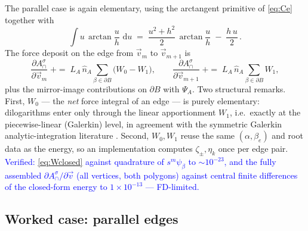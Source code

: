 \documentclass[11pt]{article}
\newcommand{\aside}[1]{\textcolor{blue}{#1}}
\newcommand{\atan}{\operatorname{arctan}}
\newcommand{\dd}{\,\mathrm{d}}
\newcommand{\nA}{\hat n_A}
\newcommand{\Acap}{A^{\sigma}_{\cap}}
\begin{document}
The parallel case is again elementary, using the arctangent primitive of
\eqref{eq:Ce} together with
\begin{equation*}
  \int\! u\,\atan\frac{u}{h}\,\dd u
  \;=\; \frac{u^2{+}h^2}{2}\,\atan\frac{u}{h}\;-\;\frac{h\,u}{2}\, .
\end{equation*}
The force deposit on the edge from $\vec v_m$ to $\vec v_{m+1}$ is
\begin{equation}
  \frac{\partial\Acap}{\partial\vec v_m}\;{+}{=}\;
  L_A\,\nA \sum_{\beta\in\partial B}\bigl(W_0-W_1\bigr),
  \qquad
  \frac{\partial\Acap}{\partial\vec v_{m+1}}\;{+}{=}\;
  L_A\,\nA \sum_{\beta\in\partial B} W_1 ,
  \label{eq:deposit}
\end{equation}
plus the mirror-image contributions on $\partial B$ with $\Psi_A$.  Two structural
remarks.  First, $W_0$ --- the \emph{net} force integral of an edge --- is purely
elementary: dilogarithms enter only through the linear apportionment $W_1$, i.e.\
exactly at the piecewise-linear (Galerkin) level, in agreement with the symmetric
Galerkin analytic-integration literature \cite{Carini1999,Salvadori2002}.  Second,
$W_0,W_1$ reuse the same $(\alpha,\beta_e)$ and root data as the energy, so an
implementation computes $\zeta_\pm,\eta_k$ once per edge pair.  \aside{Verified:
\eqref{eq:Wclosed} against quadrature of $s^m\psi_\beta$ to $\sim10^{-23}$, and the
fully assembled $\partial\Acap/\partial\vec v$ (all vertices, both polygons) against
central finite differences of the closed-form energy to $1\times10^{-13}$ ---
FD-limited.}

\subsection{Worked case: parallel edges}
\label{sec:parallel}
\end{document}
